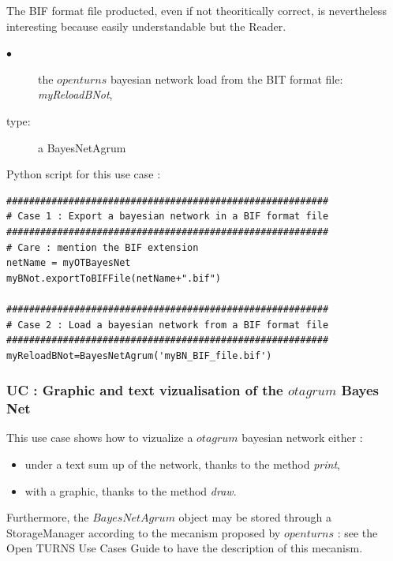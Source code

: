 The BIF format file producted, even if not theoritically correct, is nevertheless interesting because easily understandable but the Reader.\\

{
  \begin{description}
  \item[$\bullet$] the $openturns$ bayesian network load from the BIT format file: {\itshape myReloadBNot},
  \item[type:] a BayesNetAgrum
  \end{description}
}

\espace 

Python  script for this use case :

\begin{lstlisting}
#########################################################
# Case 1 : Export a bayesian network in a BIF format file
#########################################################
# Care : mention the BIF extension
netName = myOTBayesNet
myBNot.exportToBIFFile(netName+".bif")

#########################################################
# Case 2 : Load a bayesian network from a BIF format file
#########################################################
myReloadBNot=BayesNetAgrum('myBN_BIF_file.bif')
\end{lstlisting}



\newpage \subsubsection{UC : Graphic and text vizualisation  of the $otagrum$  Bayes Net}


This use case shows how to vizualize a $otagrum$ bayesian network either :
\begin{itemize}
  \item under a text sum up of the network, thanks to the method {\itshape print},
  \item with a graphic, thanks to the method {\itshape draw}.
\end{itemize}
Furthermore, the $BayesNetAgrum$ object may be stored through a StorageManager according to the mecanism proposed by $openturns$ : see the Open TURNS Use Cases Guide to have the description of this mecanism.\\


